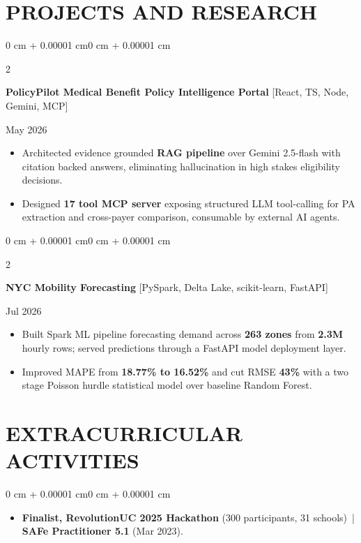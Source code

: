 \documentclass[10pt, letterpaper]{article}
\newenvironment{highlights}{
    \begin{itemize}[
        topsep=0.10 cm,
        parsep=0.06 cm,
        partopsep=0pt,
        itemsep=0.06 cm,
        leftmargin=12pt
    ]
}{
    \end{itemize}
}
\newenvironment{onecolentry}{
    \begin{adjustwidth}{0 cm + 0.00001 cm}{0 cm + 0.00001 cm}
}{
    \end{adjustwidth}
}
\newenvironment{twocolentry}[2][]{
    \onecolentry
    \def\secondColumn{#2}
    \setcolumnwidth{\fill, 4.5 cm}
    \begin{paracol}{2}
}{
    \switchcolumn \raggedleft \secondColumn
    \end{paracol}
    \endonecolentry
}
\begin{document}
\section{PROJECTS AND RESEARCH}
\begin{twocolentry}{May 2026}
\textbf{PolicyPilot Medical Benefit Policy Intelligence Portal} [React, TS, Node, Gemini, MCP]
\end{twocolentry}
\begin{highlights}
  \item Architected evidence grounded \textbf{RAG pipeline} over Gemini 2.5-flash with citation backed answers, eliminating hallucination in high stakes eligibility decisions.
  \item Designed \textbf{17 tool MCP server} exposing structured LLM tool-calling for PA extraction and cross-payer comparison, consumable by external AI agents.
\end{highlights}

\vspace{0.12 cm}

\begin{twocolentry}{Jul 2026}
\textbf{NYC Mobility Forecasting} [PySpark, Delta Lake, scikit-learn, FastAPI]
\end{twocolentry}
\begin{highlights}
  \item Built Spark ML pipeline forecasting demand across \textbf{263 zones} from \textbf{2.3M} hourly rows; served predictions through a FastAPI model deployment layer.
  \item Improved MAPE from \textbf{18.77\% to 16.52\%} and cut RMSE \textbf{43\%} with a two stage Poisson hurdle statistical model over baseline Random Forest.
\end{highlights}

\section{EXTRACURRICULAR ACTIVITIES}
\begin{onecolentry}
\begin{highlights}
  \item \textbf{Finalist, RevolutionUC 2025 Hackathon} (300 participants, 31 schools) \,|\, \textbf{SAFe Practitioner 5.1} (Mar 2023).
\end{highlights}
\end{onecolentry}
\end{document}
